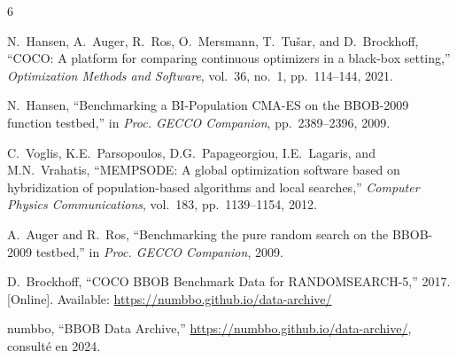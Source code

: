 \documentclass[conference]{IEEEtran}
\begin{document}
\begin{thebibliography}{6}

N.~Hansen, A.~Auger, R.~Ros, O.~Mersmann, T.~Tu\v{s}ar, and D.~Brockhoff,
``COCO: A platform for comparing continuous optimizers in a black-box setting,''
\textit{Optimization Methods and Software}, vol.~36, no.~1, pp.~114--144, 2021.

N.~Hansen,
``Benchmarking a BI-Population CMA-ES on the BBOB-2009 function testbed,''
in \textit{Proc. GECCO Companion}, pp.~2389--2396, 2009.

C.~Voglis, K.E.~Parsopoulos, D.G.~Papageorgiou, I.E.~Lagaris, and M.N.~Vrahatis,
``MEMPSODE: A global optimization software based on hybridization of population-based algorithms and local searches,''
\textit{Computer Physics Communications}, vol.~183, pp.~1139--1154, 2012.

A.~Auger and R.~Ros,
``Benchmarking the pure random search on the BBOB-2009 testbed,''
in \textit{Proc. GECCO Companion}, 2009.

D.~Brockhoff,
``COCO BBOB Benchmark Data for RANDOMSEARCH-5,''
2017. [Online]. Available: \url{https://numbbo.github.io/data-archive/}

numbbo,
``BBOB Data Archive,''
\url{https://numbbo.github.io/data-archive/}, consult\'e en 2024.

\end{thebibliography}
\end{document}
